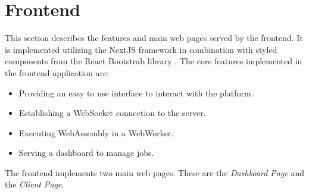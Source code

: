 \section{Frontend}
\label{sec:implementation:frontend}
This section describes the features and main web pages served by the frontend. It is implemented utilizing the NextJS framework in combination with styled components from the React Bootstrab library \cite{implementation:bootstrap}. The core features implemented in the frontend application are:
\begin{itemize}
    \item Providing an easy to use interface to interact with the platform.
    \item Establishing a WebSocket connection to the server.
    \item Executing WebAssembly in a WebWorker.
    \item Serving a dashboard to manage jobs.
\end{itemize}
The frontend implements two main web pages. These are the \emph{Dashboard Page} and the \emph{Client Page}.

